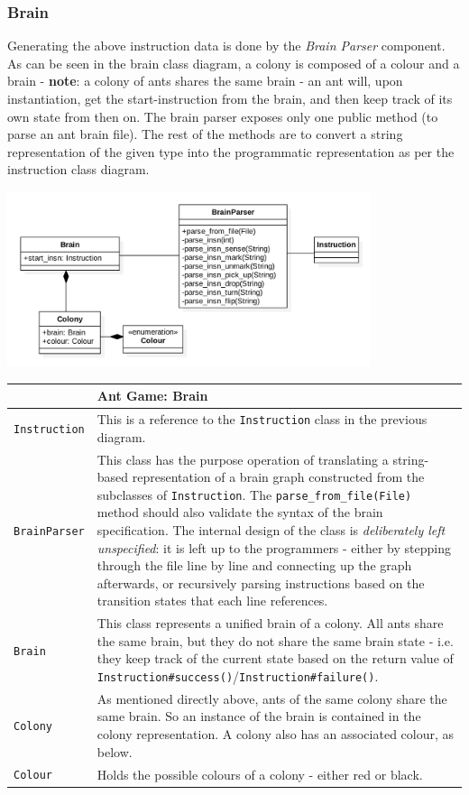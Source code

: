 \documentclass[11pt]{article}
\begin{document}
\subsubsection{Brain}

Generating the above instruction data is done by the \textit{Brain Parser} component. As can be seen in the brain class diagram, a colony is composed of a colour and a brain - \textbf{note}: a colony of ants shares the same brain - an ant will, upon instantiation, get the start-instruction from the brain, and then keep track of its own state from then on. The brain parser exposes only one public method (to parse an ant brain file). The rest of the methods are to convert a string representation of the given type into the programmatic representation as per the instruction class diagram.

\begin{center}
\includegraphics[width=0.8\textwidth]{low-level-diagrams/class/brain.png}
\end{center}

\begin{longtable}[c]{@{}p{}p{}@{}}
\toprule
& Ant Game: Brain\tabularnewline
\midrule

\texttt{Instruction} & This is a reference to the \texttt{Instruction} class in the previous diagram. \tabularnewline
\texttt{BrainParser} & This class has the purpose operation of translating a string-based representation of a brain graph constructed from the subclasses of \texttt{Instruction}. The \texttt{parse\_from\_file(File)} method should also validate the syntax of the brain specification. The internal design of the class is \textit{deliberately left unspecified}: it is left up to the programmers - either by stepping through the file line by line and connecting up the graph afterwards, or recursively parsing instructions based on the transition states that each line references. \tabularnewline
\texttt{Brain} & This class represents a unified brain of a colony. All ants share the same brain, but they do not share the same brain state - i.e. they keep track of the current state based on the return value of \texttt{Instruction\#success()}/\texttt{Instruction\#failure()}. \tabularnewline
\texttt{Colony} & As mentioned directly above, ants of the same colony share the same brain. So an instance of the brain is contained in the colony representation. A colony also has an associated colour, as below. \tabularnewline
\texttt{Colour} & Holds the possible colours of a colony - either red or black. \tabularnewline
\bottomrule
\end{longtable}
\end{document}
